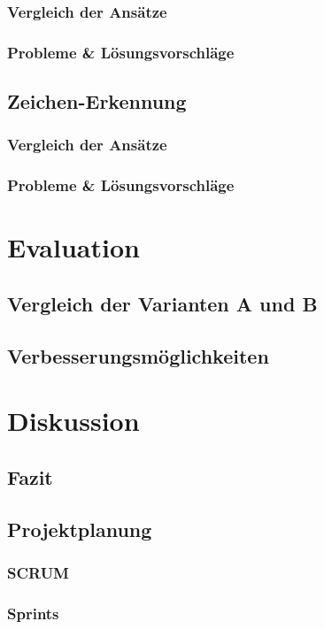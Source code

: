 \documentclass[a4paper,twopage,ngerman,11pt]{scrreprt}
\begin{document}
		\section{Vergleich der Ansätze}
		\section{Probleme \& Lösungsvorschläge}
		
		\chapter{Zeichen-Erkennung}
		\section{Vergleich der Ansätze}
		\section{Probleme \& Lösungsvorschläge}
		
		

	\part{Evaluation}
		\chapter{Vergleich der Varianten A und B}
		\chapter{Verbesserungsmöglichkeiten}

	\part{Diskussion}
		\chapter{Fazit}



	\makeglossaries

	
	{}
	
	\appendix
	\chapter{Projektplanung}
		\section{SCRUM}
		\section{Sprints}
\end{document}

